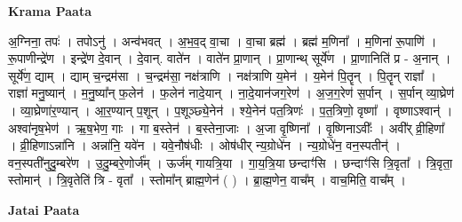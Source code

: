 \documentclass[17pt]{extarticle}
\begin{document}
\textbf{Krama Paata} \newline

अ॒ग्निना॒ तपः॑ । तपोऽनु॑ । अन्व॑भवत् । अ॒भ॒व॒द् वा॒चा । वा॒चा ब्रह्म॑ । ब्रह्म॑ म॒णिना᳚ । म॒णिना॑ रू॒पाणि॑ । रू॒पाणीन्द्रे॑ण । इन्द्रे॑ण दे॒वान् । दे॒वान्. वाते॑न । वाते॑न प्रा॒णान् । प्रा॒णान्थ् सूर्ये॑ण । प्रा॒णानिति॑ प्र - अ॒नान् । सूर्ये॑ण॒ द्याम् । द्याम् च॒न्द्रम॑सा । च॒न्द्रम॑सा॒ नक्ष॑त्राणि । नक्ष॑त्राणि य॒मेन॑ । य॒मेन॑ पि॒तॄन् । पि॒तॄन् राज्ञा᳚ । राज्ञा॑ मनु॒ष्यान्॑ । म॒नु॒ष्या᳚न् फ॒लेन॑ । फ॒लेन॑ नादे॒यान् । ना॒दे॒यान॑जग॒रेण॑ । अ॒ज॒ग॒रेण॑ स॒र्पान् । स॒र्पान् व्या॒घ्रेण॑ । व्या॒घ्रेणा॑र॒ण्यान् । आ॒र॒ण्यान् प॒शून् । प॒शूञ्छ्ये॒नेन॑ । श्ये॒नेन॑ पत॒त्रिणः॑ । प॒त॒त्रिणो॒ वृष्णा᳚ । वृष्णाऽश्वान्॑ । अश्वा॑नृष॒भेण॑ । ऋ॒ष॒भेण॒ गाः । गा ब॒स्तेन॑ । ब॒स्तेना॒जाः । अ॒जा वृ॒ष्णिना᳚ । वृ॒ष्णिनाऽवीः᳚ । अवी᳚र् व्री॒हिणा᳚ । व्री॒हिणाऽन्ना॑नि । अन्ना॑नि॒ यवे॑न । यवे॒नौष॑धीः । ओष॑धीर् न्य॒ग्रोधे॑न । न्य॒ग्रोधे॑न॒ वन॒स्पतीन्॑ । वन॒स्पती॑नुदु॒म्बरे॑ण । उ॒दु॒म्बरे॒णोर्ज᳚म् । ऊर्ज॑म् गायत्रि॒या । गा॒य॒त्रि॒या छन्दाꣳ॑सि । छन्दाꣳ॑सि त्रि॒वृता᳚ । त्रि॒वृता॒ स्तोमान्॑ । त्रि॒वृतेति॑ त्रि - वृता᳚ । स्तोमा᳚न् ब्राह्म॒णेन॑ ( ) । ब्रा॒ह्म॒णेन॒ वाच᳚म् । वाच॒मिति॒ वाच᳚म् । \newline

\textbf{Jatai Paata} \newline
\end{document}
